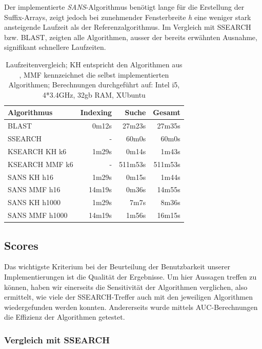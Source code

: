 \documentclass{article}
\begin{document}
Der implementierte \emph{SANS}-Algorithmus benötigt lange für die Erstellung der Suffix-Arrays, zeigt jedoch bei zunehmender Fensterbreite \textit h eine weniger stark ansteigende Laufzeit als der Referenzalgorithmus.  Im Vergleich mit SSEARCH bzw. BLAST,  zeigten alle Algorithmen, ausser der bereits erwähnten Ausnahme, signifikant schnellere Laufzeiten.

  \begin{table}[h]
    \caption{Laufzeitenvergleich; KH entspricht den Algorithmen aus \cite{Holm}, MMF kennzeichnet die selbst implementierten Algorithmen; Berechnungen durchgeführt auf: Intel i5, 4*3.4GHz, 32gb RAM, XUbuntu}
    \begin{center}
    \begin{tabular}{lrrr}
    \hline
    Algorithmus & Indexing & Suche & Gesamt\\
    \hline
    BLAST & 0m12s & 27m23s & 27m35s\\
    SSEARCH & - & 60m0s & 60m0s\\
    KSEARCH KH k6 & 1m29s & 0m14s & 1m43s\\
    KSEARCH MMF k6 & -  & 511m53s & 511m53s\\
    SANS KH h16 & 1m29s &  0m15s & 1m44s\\
    SANS MMF  h16 & 14m19s & 0m36s & 14m55s\\
    SANS KH h1000 & 1m29s & 7m7s & 8m36s\\
    SANS MMF  h1000 & 14m19s & 1m56s & 16m15s\\
    \hline
    \end{tabular}
    \label{runtimes}
    \end{center}
  \end{table}

\subsection{Scores}

Das wichtigste Kriterium bei der Beurteilung der Benutzbarkeit unserer Implementierungen ist die Qualität der Ergebnisse. Um hier Aussagen treffen zu können, haben wir einerseits die Sensitivität der Algorithmen verglichen, also ermittelt, wie viele der SSEARCH-Treffer auch mit den jeweiligen Algorithmen wiedergefunden werden konnten. Andererseits wurde mittels AUC-Berechnungen die Effizienz der Algorithmen getestet.


\subsubsection{Vergleich mit SSEARCH}
\end{document}

